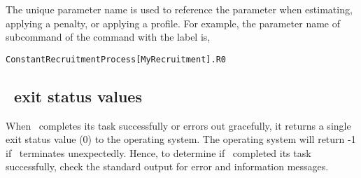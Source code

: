 The unique parameter name is used to reference the parameter when estimating, applying a penalty, or applying a profile. For example, the parameter name of subcommand  of the command  with the label  is,

\texttt{ConstantRecruitmentProcess[MyRecruitment].R0}

\subsection{\SPM\ exit status values}

When \SPM\ completes its task successfully or errors out gracefully, it returns a single exit status value (0) to the operating system. The operating system will return -1 if \SPM\ terminates unexpectedly. Hence, to determine if \SPM\ completed its task successfully, check the standard output for error and information messages.
